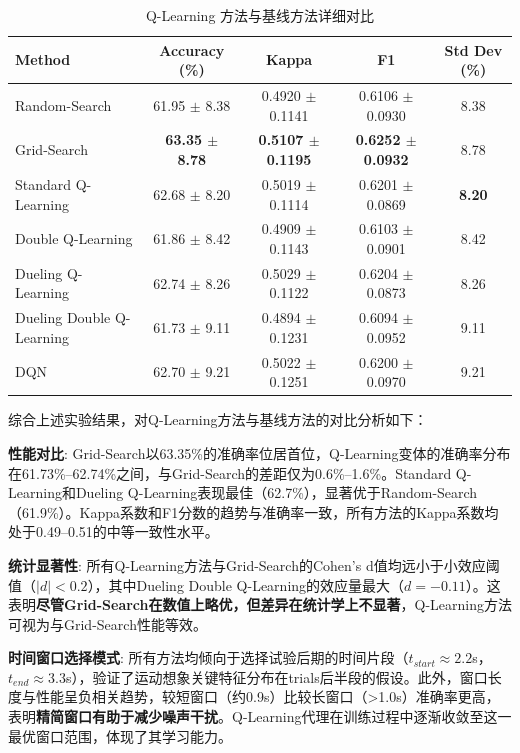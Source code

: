 \begin{table}[H]
\centering
\caption{Q-Learning 方法与基线方法详细对比}
\label{tab:ql_comparison}
\small
\begin{tabular}{lcccc}
\hline
\textbf{Method}  & \textbf{Accuracy (\%)} & \textbf{Kappa} & \textbf{F1} & \textbf{Std Dev (\%)}  \\
\hline
Random-Search  & 61.95 $\pm$ 8.38 & 0.4920 $\pm$ 0.1141 & 0.6106 $\pm$ 0.0930 & 8.38  \\
Grid-Search  & \textbf{63.35 $\pm$ 8.78} & \textbf{0.5107 $\pm$ 0.1195} & \textbf{0.6252 $\pm$ 0.0932} & 8.78  \\
Standard Q-Learning  & 62.68 $\pm$ 8.20 & 0.5019 $\pm$ 0.1114 & 0.6201 $\pm$ 0.0869 & \textbf{8.20}  \\
Double Q-Learning  & 61.86 $\pm$ 8.42 & 0.4909 $\pm$ 0.1143 & 0.6103 $\pm$ 0.0901 & 8.42  \\
Dueling Q-Learning  & 62.74 $\pm$ 8.26 & 0.5029 $\pm$ 0.1122 & 0.6204 $\pm$ 0.0873 & 8.26  \\
Dueling Double Q-Learning  & 61.73 $\pm$ 9.11 & 0.4894 $\pm$ 0.1231 & 0.6094 $\pm$ 0.0952 & 9.11  \\
DQN  & 62.70 $\pm$ 9.21 & 0.5022 $\pm$ 0.1251 & 0.6200 $\pm$ 0.0970 & 9.21  \\
\hline
\end{tabular}
\end{table}

\label{subsec:ql_analysis}

综合上述实验结果，对Q-Learning方法与基线方法的对比分析如下：

\textbf{性能对比}: Grid-Search以63.35\%的准确率位居首位，Q-Learning变体的准确率分布在61.73\%--62.74\%之间，与Grid-Search的差距仅为0.6\%--1.6\%。Standard Q-Learning和Dueling Q-Learning表现最佳（62.7\%），显著优于Random-Search（61.9\%）。Kappa系数和F1分数的趋势与准确率一致，所有方法的Kappa系数均处于0.49--0.51的中等一致性水平。

\textbf{统计显著性}: 所有Q-Learning方法与Grid-Search的Cohen's d值均远小于小效应阈值（$|d| < 0.2$），其中Dueling Double Q-Learning的效应量最大（$d=-0.11$）。这表明\textbf{尽管Grid-Search在数值上略优，但差异在统计学上不显著}，Q-Learning方法可视为与Grid-Search性能等效。

\textbf{时间窗口选择模式}: 所有方法均倾向于选择试验后期的时间片段（$t_{start} \approx 2.2$s，$t_{end} \approx 3.3$s），验证了运动想象关键特征分布在trials后半段的假设。此外，窗口长度与性能呈负相关趋势，较短窗口（约0.9s）比较长窗口（>1.0s）准确率更高，表明\textbf{精简窗口有助于减少噪声干扰}。Q-Learning代理在训练过程中逐渐收敛至这一最优窗口范围，体现了其学习能力。

